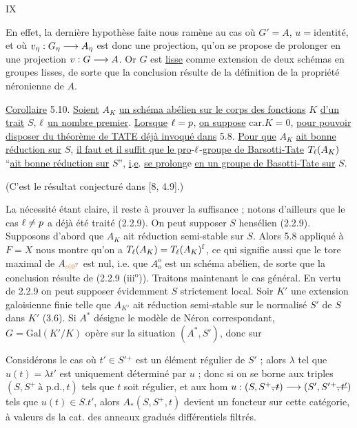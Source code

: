 \hfill IX

En effet, la dernière hypothèse faite nous ramène au cas où
$G'=A$, $u=\text{identité}$, et où $v_{\eta}:G_{\eta}\longrightarrow A_{\eta}$ est donc une projection, qu'on se propose de prolonger en une projection $v:G\longrightarrow A$. Or $G$ est \uline{lisse} comme extension de deux schémas en groupes lisses, de sorte que la conclusion résulte de la définition de la propriété néronienne de $A$.

\uline{Corollaire} 5.10. \uline{Soient} $A_K$ \uline{un schéma abélien sur le corps des fonctions} $K$ \uline{d'un trait} $S$, $\ell$ \uline{un nombre premier}. \uline{Lorsque} $\ell=p$, \uline{on suppose} $\mathrm{car.}K=0$,
\uline{pour pouvoir disposer du théorème de TATE déjà invoqué dans} 5.8. \uline{Pour que} $A_K$ \uline{ait bonne réduction sur} $S$, \uline{il faut et il suffit que le pro}-$\ell$-\uline{groupe de Barsotti-Tate} $T_{\ell}(A_K)$ ``\uline{ait bonne réduction sur} $S$'', \uline{i}.\uline{e}. \uline{se prolong}e \uline{en un groupe de Basotti-Tate sur} $S$.

(C'est le résultat conjecturé dans [8, 4.9].)

La nécessité étant claire, il reste à prouver la suffisance ; notons d'ailleurs que le cas $\ell\ne p$ a déjà été traité (2.2.9). On peut supposer $S$ hensélien (2.2.9). Supposons d'abord que $A_K$ ait réduction semi-stable sur $S$. Alors 5.8 appliqué à $F=X$ nous montre qu'on a
$T_{\ell}(A_K)=T_{\ell}(A_K)^{\mathrm f}$, ce qui signifie aussi que le tore maximal de $A_{\unsure{o|0}}$ est
nul, i.e. que $A_o^o$ est un schéma abélien, de sorte que la conclusion résulte de (2.2.9 (iii$^{\mathrm o}$)). Traitons maintenant le cas général. En vertu de 2.2.9 on peut supposer évidemment $S$ strictement local.
Soir $K'$ une extension galoisienne finie telle que $A_{K'}$ ait réduction semi-stable sur le normalisé $S'$ de $S$ dans $K'$ (3.6). Si $A^*$ désigne le modèle de Néron correspondant, $G=\mathrm{Gal}(K'/K)$ opère sur la situation $(A^*,S')$, donc sur

Considérons le cas où $t'\in S'{}^+$ est un élément régulier de $S'$ ; alors $\lambda$ tel que $u(t)=\lambda t'$ est uniquement déterminé par $u$ ; donc si on se borne aux
triples $(S,S^+\ \text{à p.d.},t)$ tels que $t$ soit régulier, et aux hom $u:(S,S^+\deleted{,t})\longrightarrow(S',S'{}^+\deleted{,t'})$ tels que $u(t)\in S.t'$, alors $A_\ast(S,S^+,t)$ devient un foncteur sur cette catégorie, à valeurs ds la cat. des
 anneaux gradués  différentiels  filtrés.

